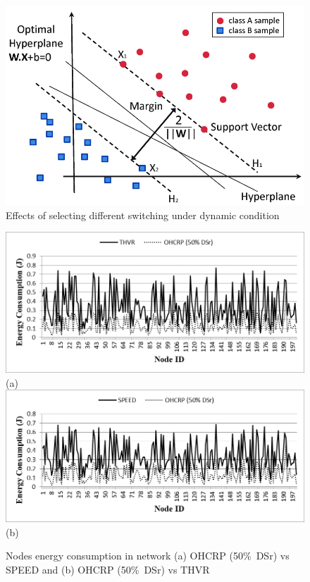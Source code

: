 \documentclass{telkomnika}
\begin{document}
\begin{figure}[H]
\centering
\includegraphics[scale=0.4]{figure1}
\vspace{.7em}
\caption{Effects of selecting different switching under dynamic condition}
\end{figure}

\begin{figure}[H]
\centering
\includegraphics[scale=0.7]{figure2(a)}\\
(a)\\
\vspace{.7em}
\includegraphics[scale=0.7]{figure2(b)}\\
(b)\\
\vspace{.7em}
\caption{Nodes energy consumption in network (a) OHCRP (50\%\ DSr) vs SPEED and \linebreak (b) OHCRP (50\%\ DSr) vs THVR}
\end{figure}
\end{document}
